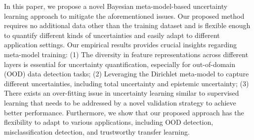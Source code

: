 In this paper, we propose a novel Bayesian meta-model-based uncertainty learning approach to mitigate the aforementioned issues. Our proposed method requires no additional data other than the training dataset and is flexible enough to quantify different kinds of uncertainties and easily adapt to different application settings.
Our empirical results provides crucial insights regarding meta-model training: (1) The diversity in feature representations across different layers is essential for uncertainty quantification, especially for out-of-domain (OOD) data detection tasks; (2) Leveraging the Dirichlet meta-model to capture different uncertainties, including total uncertainty and epistemic uncertainty; (3) There exists an over-fitting issue in uncertainty learning similar to supervised learning that needs to be addressed by a novel validation strategy to achieve better performance. Furthermore, we show that our proposed approach has the flexibility to adapt to various applications, including OOD detection, misclassification detection, and trustworthy transfer learning. %


